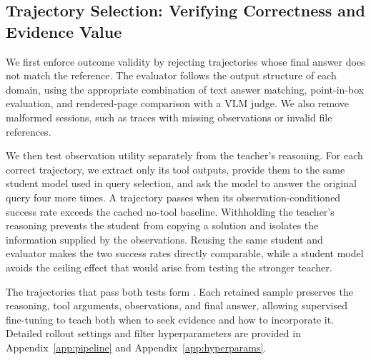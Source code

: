 \subsection{Trajectory Selection: Verifying Correctness and Evidence Value}
\label{sec:filtering}

We first enforce outcome validity by rejecting trajectories whose final answer does not match the reference. The evaluator follows the output structure of each domain, using the appropriate combination of text answer matching, point-in-box evaluation, and rendered-page comparison with a VLM judge. We also remove malformed sessions, such as traces with missing observations or invalid file references.

We then test observation utility separately from the teacher's reasoning. For each correct trajectory, we extract only its tool outputs, provide them to the same student model used in query selection, and ask the model to answer the original query four more times. A trajectory passes when its observation-conditioned success rate exceeds the cached no-tool baseline. Withholding the teacher's reasoning prevents the student from copying a solution and isolates the information supplied by the observations. Reusing the same student and evaluator makes the two success rates directly comparable, while a student model avoids the ceiling effect that would arise from testing the stronger teacher.

The trajectories that pass both tests form \dataset. Each retained sample preserves the reasoning, tool arguments, observations, and final answer, allowing supervised fine-tuning to teach both when to seek evidence and how to incorporate it. Detailed rollout settings and filter hyperparameters are provided in Appendix~\ref{app:pipeline} and Appendix~\ref{app:hyperparams}.
